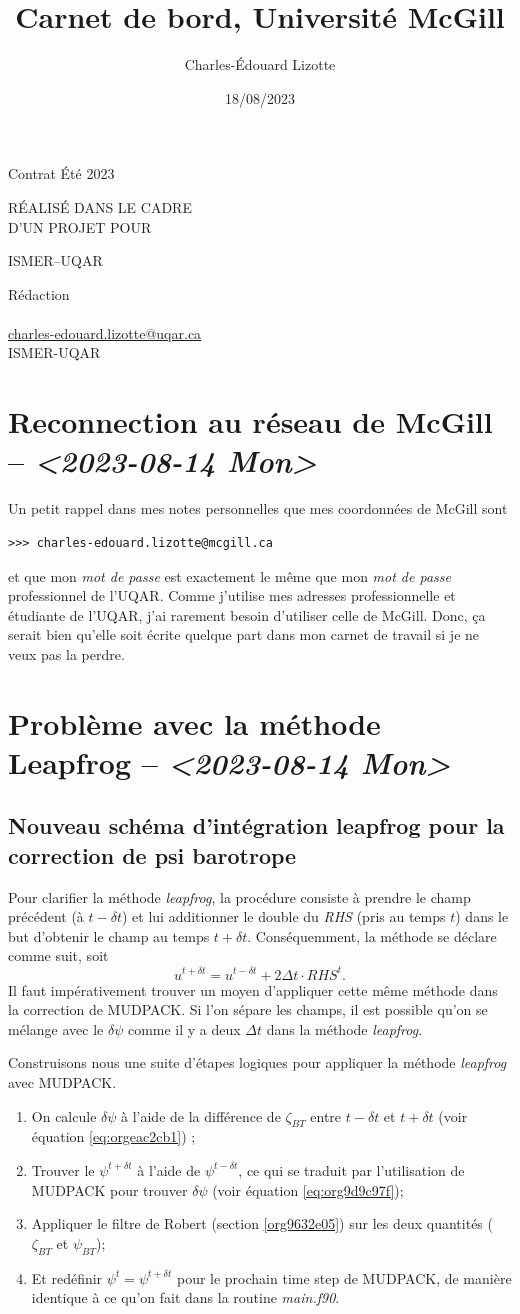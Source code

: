 \documentclass[10pt]{article}
\author{Charles-Édouard Lizotte}
\date{18/08/2023}
\title{Carnet de bord, Université McGill}
\makeatletter
\numberwithin{equation}{section}
\newcommand{\mytitlepage}{
\begin{titlepage}
\begin{center}
{\Large Contrat Été 2023 \par}
\vspace{2cm}
{\Large \MakeUppercase{\thetitle} \par}
\vspace{2cm}
RÉALISÉ DANS LE CADRE\\ D'UN PROJET POUR \par
\vspace{2cm}
{\Large ISMER--UQAR \par}
\vspace{2cm}
{\thedate}
\end{center}
\vfill
Rédaction \\
{\theauthor}\\
\url{charles-edouard.lizotte@uqar.ca}\\
ISMER-UQAR
\end{titlepage}
}
\makeatother
\begin{document}
\mytitlepage
\tableofcontents\newpage

\section{Reconnection au réseau de McGill -- \textit{<2023-08-14 Mon>}}
\label{sec:orgc9b6334}
Un petit rappel dans mes notes personnelles que mes coordonnées de McGill sont
\begin{verbatim}
>>> charles-edouard.lizotte@mcgill.ca
\end{verbatim}
et que mon \emph{mot de passe} est exactement le même que mon \emph{mot de passe} professionnel de l'UQAR.
Comme j'utilise mes adresses professionnelle et étudiante de l'UQAR, j'ai rarement besoin d'utiliser celle de McGill.
Donc, ça serait bien qu'elle soit écrite quelque part dans mon carnet de travail si je ne veux pas la perdre.


\section{Problème avec la méthode Leapfrog -- \textit{<2023-08-14 Mon>}}
\label{sec:org2044bf4}

\subsection{Nouveau schéma d'intégration leapfrog pour la correction de psi barotrope}
\label{sec:org789bc0c}
Pour clarifier la méthode \emph{leapfrog}, la procédure consiste à prendre le champ précédent (à \(t-\delta t\)) et lui additionner le double du \emph{RHS} (pris au temps \(t\)) dans le but d'obtenir le champ au temps \(t+\delta t\).
Conséquemment, la méthode se déclare comme suit, soit
\begin{equation}
   u^{t+\delta t} = u^{t-\delta t} + 2\Delta t\cdot RHS^t.
\end{equation}
Il faut impérativement trouver un moyen d'appliquer cette même méthode dans la correction de MUDPACK.
Si l'on sépare les champs, il est possible qu'on se mélange avec le \(\delta \psi\) comme il y a deux \(\Delta t\) dans la méthode \emph{leapfrog}.\bigskip

Construisons nous une suite d'étapes logiques pour appliquer la méthode \emph{leapfrog} avec MUDPACK.
\begin{enumerate}
\item On calcule \(\delta \psi\) à l'aide de la différence de \(\zeta_{BT}\) entre \(t-\delta t\) et \(t+\delta t\) (voir équation \ref{eq:orgeac2cb1}) ;
\item Trouver le \(\psi^{t+\delta t}\) à l'aide de \(\psi^{t-\delta t}\), ce qui se traduit par l'utilisation de MUDPACK pour trouver \(\delta \psi\) (voir équation \ref{eq:org9d9c97f});
\item Appliquer le filtre de Robert (section \ref{org9632e05})  sur les deux quantités (\(\zeta_{BT}\) et \(\psi_{BT}\));
\item Et redéfinir \(\psi^t = \psi^{t+\delta t}\) pour le prochain time step de MUDPACK, de manière identique à ce qu'on fait dans la routine \emph{main.f90}.
\end{enumerate}
\end{document}
